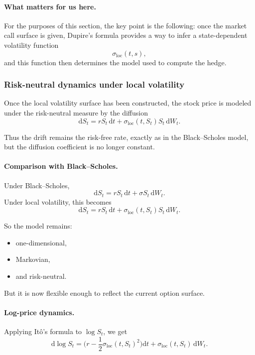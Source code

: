 \documentclass[11pt]{article}
\theoremstyle{plain}
\theoremstyle{definition}
\theoremstyle{remark}
\begin{document}
\paragraph{What matters for us here.}
For the purposes of this section, the key point is the following:
once the market call surface is given, Dupire's formula provides a way
to infer a state-dependent volatility function
\[
\sigma_{\mathrm{loc}}(t,s),
\]
and this function then determines the model used to compute the hedge.

\subsubsection{Risk-neutral dynamics under local volatility}

Once the local volatility surface has been constructed, the stock price
is modeled under the risk-neutral measure by the diffusion
\[
\boxed{
\mathrm{d}S_t
=
rS_t\,\mathrm{d}t
+
\sigma_{\mathrm{loc}}(t,S_t)S_t\,\mathrm{d}W_t.
}
\]

Thus the drift remains the risk-free rate, exactly as in the
Black--Scholes model, but the diffusion coefficient is no longer
constant.

\paragraph{Comparison with Black--Scholes.}
Under Black--Scholes,
\[
\mathrm{d}S_t=rS_t\,\mathrm{d}t+\sigma S_t\,\mathrm{d}W_t.
\]
Under local volatility, this becomes
\[
\mathrm{d}S_t=rS_t\,\mathrm{d}t+\sigma_{\mathrm{loc}}(t,S_t)S_t\,\mathrm{d}W_t.
\]

So the model remains:
\begin{itemize}[leftmargin=1.4em]
    \item one-dimensional,
    \item Markovian,
    \item and risk-neutral.
\end{itemize}

But it is now flexible enough to reflect the current option surface.

\paragraph{Log-price dynamics.}
Applying It\^o's formula to \(\log S_t\), we get
\[
\mathrm{d}\log S_t
=
\Big(
r-\frac12 \sigma_{\mathrm{loc}}(t,S_t)^2
\Big)\mathrm{d}t
+
\sigma_{\mathrm{loc}}(t,S_t)\,\mathrm{d}W_t.
\]
\end{document}
